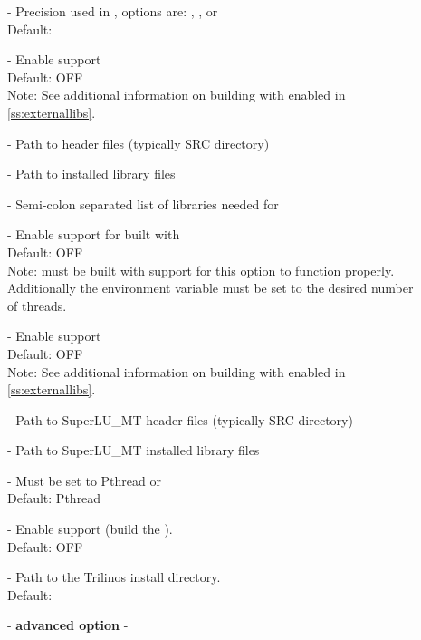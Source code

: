 \begin{description}
\item[] -
  Precision used in {\sundials}, options are: , , or 
  \\
  Default: 
\item[] -
  Enable {\superludist} support
  \\
  Default: OFF
  \\
  Note: See additional information on building with {\superludist} enabled
  in \ref{ss:externallibs}.
\item[] -
  Path to {\superludist} header files (typically SRC directory)
\item[] -
  Path to {\superludist} installed library files
\item[] -
  Semi-colon separated list of libraries needed for {\superludist}
\item[] -
  Enable {\sundials} support for {\superludist} built with {\openmp}
  \\
  Default: OFF
  \\
  Note: {\superludist} must be built with {\openmp} support for this option to function
  properly. Additionally the environment variable  must be set to
  the desired number of threads.
\item[] -
  Enable {\superlumt} support
  \\
  Default: OFF
  \\
  Note: See additional information on building with {\superlumt} enabled
  in \ref{ss:externallibs}.
\item[] -
  Path to SuperLU\_MT header files (typically SRC directory)
\item[] -
  Path to SuperLU\_MT installed library files
\item[] -
  Must be set to Pthread or {\openmp}
  \\
  Default: Pthread
\item[] -
  Enable {\trilinos} support (build the {\tpetra} {\nvector}).
  \\
  Default: OFF
\item[] -
  Path to the Trilinos install directory.
  \\
  Default:
\item[] - \textbf{advanced option} -

\end{description}
